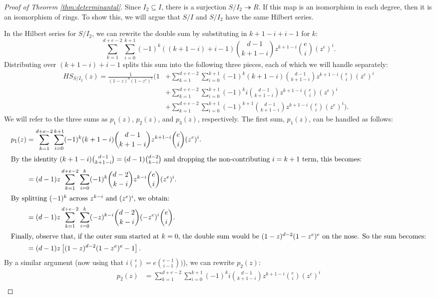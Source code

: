 \documentclass[10pt,a4paper]{amsart}
\begin{document}
\begin{proof}[Proof of Theorem \ref{thm:determinantal}]
Since $I_2 \subseteq I$, there is a surjection $S/I_2 \twoheadrightarrow R$.  If this map is an isomorphism in each degree, then it is an isomorphism of rings.  To show this, we will argue that $S/I$ and $S/I_2$ have the same Hilbert series.

In the Hilbert series for $S/I_2$, we can rewrite the double sum by substituting in $k+1-i+i-1$ for $k$:
$$
\sum_{k=1}^{d+e-2}\sum_{i=0}^{k+1}(-1)^k((k+1-i)+i-1)\binom{{d-1}}{{k+1-i}}z^{k+1-i}\binom{e}{i}(z^e)^i.
$$
Distributing over $(k+1-i)+i-1$ splits this sum into the following three pieces, each of which we will handle separately:
\begin{align*}
HS_{S/I_2}(z) = \frac{1}{(1-z)^d(1-z^e)^e}\Bigg( 1&+  \sum_{k=1}^{d+e-2}\sum_{i=0}^{k+1}(-1)^k(k+1-i)\binom{{d-1}}{{k+1-i}}z^{k+1-i}\binom{e}{i}(z^e)^i \\
&+ \sum_{k=1}^{d+e-2}\sum_{i=0}^{k+1}(-1)^ki\binom{d-1 }{ k+1-i}z^{k+1-i}\binom{e}{i}(z^e)^i \\
&+  \sum_{k=1}^{d+e-2}\sum_{i=0}^{k+1}(-1)^{k+1}\binom{d-1}{ k+1-i}z^{k+1-i}\binom{e}{i}(z^e)^i\Bigg).
\end{align*}
We will refer to the three sums as $p_1(z)$, $p_2(z)$, and $p_3(z)$, respectively.
The first sum, $p_1(z)$, can be handled as follows: 
\begin{align*}
p_1(z)&=\sum_{k=1}^{d+e-2}\sum_{i=0}^{k+1}(-1)^k(k+1-i)\binom{{d-1}}{{k+1-i}}z^{k+1-i}\binom{e}{i}(z^e)^i.\\
\intertext{By the identity $(k+1-i) \binom{d-1}{k+1-i} = (d-1)\binom{d-2}{k-i}$ and dropping the non-contributing $i=k+1$ term, this becomes:}
&=(d-1)z\sum_{k=1}^{d+e-2}\sum_{i=0}^{k}(-1)^k\binom{d-2}{k-i} z^{k-i}\binom{e}{i}(z^e)^{i}.\\
\intertext{By splitting $(-1)^k$ across $z^{k-i}$ and $(z^e)^{i}$, we obtain:}
&= (d-1)z\sum_{k=1}^{d+e-2}\sum_{i=0}^{k}(-z)^{k-i}\binom{d-2}{k-i}(-z^e)^{i} \binom{e}{i}.\\
\intertext{Finally, observe that, if the outer sum started at $k=0$, the double sum would be $(1-z)^{d-2}(1-z^e)^e$ on the nose.  So the sum becomes:}
&= (d-1)z\left[(1-z)^{d-2}(1-z^e)^e- 1\right].
\end{align*}
By a similar argument (now using that $i \binom{e}{i} = e \binom{e-1}{i-1})$), we can rewrite $p_2(z)$:
\begin{align*}
p_2(z)&=\sum_{k=1}^{d+e-2}\sum_{i=0}^{k+1}(-1)^ki\binom{d-1}{k+1-i}z^{k+1-i}\binom{e}{i}(z^e)^i\\

\end{align*}
\end{proof}
\end{document}
